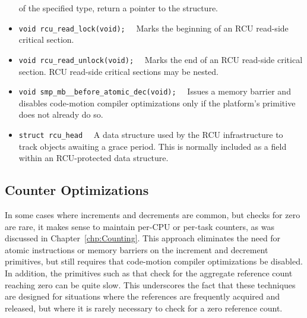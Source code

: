 \begin{itemize}
	of the specified type, return a pointer to the structure.
\item	{\tt void rcu\_read\_lock(void);}~~
	Marks the beginning of an RCU read-side critical section.
\item	{\tt void rcu\_read\_unlock(void);}~~
	Marks the end of an RCU read-side critical section.
	RCU read-side critical sections may be nested.
\item	{\tt void smp\_mb\_\_before\_atomic\_dec(void);}~~
	Issues a memory barrier and disables code-motion compiler
	optimizations only if the platform's 
	primitive does not already do so.
\item	{\tt struct rcu\_head}~~
	A data structure used by the RCU infrastructure to track
	objects awaiting a grace period.
	This is normally included as a field within an RCU-protected
	data structure.
\end{itemize}

\subsection{Counter Optimizations}
\label{sec:defer:Counter Optimizations}

In some cases where increments and decrements are common, but checks
for zero are rare, it makes sense to maintain per-CPU or per-task
counters, as was discussed in Chapter~\ref{chp:Counting}.
This approach eliminates the need for atomic instructions or memory
barriers on the increment and decrement primitives, but still requires
that code-motion compiler optimizations be disabled.
In addition, the primitives such as 
that check for the aggregate reference
count reaching zero can be quite slow.
This underscores the fact that these techniques are designed
for situations where the references are frequently acquired and
released, but where it is rarely necessary to check for a zero
reference count.
